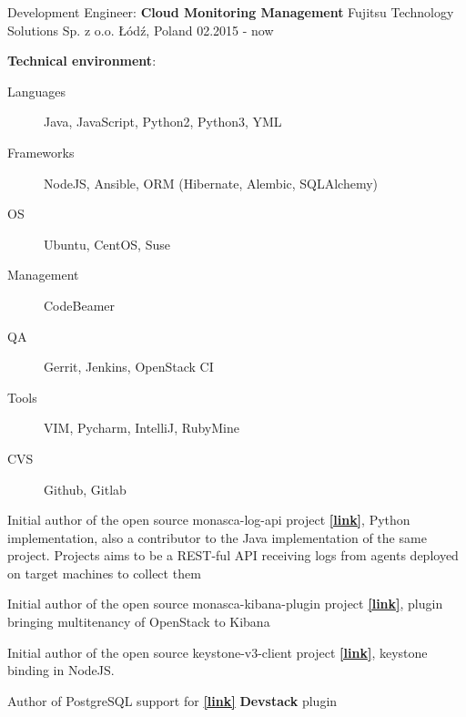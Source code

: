 
\begin{cventries}

  \cventry
  {Development Engineer: \textbf{Cloud Monitoring Management}}
  {Fujitsu Technology Solutions Sp. z o.o.}
  {Łódź, Poland}
  {02.2015 - now}
  {
    \begin{cvitems}
      \item[]{
        \textbf{Technical environment}:
        \begin{description}
            \item[Languages] Java, JavaScript, Python2, Python3, YML
            \item[Frameworks] NodeJS, Ansible, ORM (Hibernate, Alembic, SQLAlchemy)
            \item[OS] Ubuntu, CentOS, Suse
            \item[Management] CodeBeamer
            \item[QA] Gerrit, Jenkins, OpenStack CI
            \item[Tools] VIM, Pycharm, IntelliJ, RubyMine
            \item[CVS] \faGithub\acvHeaderIconSep Github, \faGitlab\acvHeaderIconSep Gitlab
        \end{description}
      }
      \item{Initial author of the open source monasca-log-api project
              \href{https://github.com/openstack/monasca-log-api}{\textbf{[\faGithubSquare\acvHeaderIconSep link]}},
          Python implementation, also a contributor to the Java implementation
          of the same project. Projects aims to be a REST-ful
          API receiving logs from agents deployed on target machines to collect them
      }
      \item{Initial author of the open source monasca-kibana-plugin
          project \href{https://github.com/openstack/monasca-kibana-plugin}{\textbf{[\faGithubSquare\acvHeaderIconSep link]}},
          plugin bringing multitenancy of OpenStack to Kibana
      }
      \item{Initial author of the open source keystone-v3-client project
          \href{https://github.com/FujitsuEnablingSoftwareTechnologyGmbH/keystone-v3-client}{\textbf{[\faGithubSquare\acvHeaderIconSep link]}}, keystone binding in NodeJS.
      }
      \item{Author of PostgreSQL support for
          \href{https://github.com/openstack/monasca-api}{\textbf{[\faGithubSquare\acvHeaderIconSep link]}} \textbf{Devstack} plugin}

\end{cvitems}}
\end{cventries}
